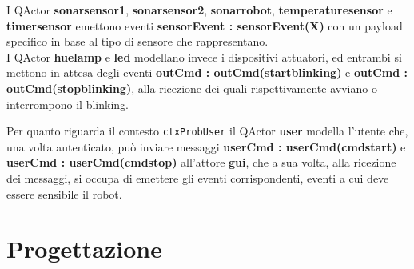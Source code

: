 \documentclass{llncs}
\newcommand{\action}[1]{\texttt{#1}\xspace}
\newcommand{\labelsec}[1]{\label{sec:#1}}
\begin{document}
I QActor \textbf{sonarsensor1}, \textbf{sonarsensor2}, \textbf{sonarrobot}, \textbf{temperaturesensor} e \textbf{timersensor} emettono eventi \textbf{sensorEvent : sensorEvent(X)} con un payload specifico in base al tipo di sensore che rappresentano. \\
I QActor \textbf{huelamp} e \textbf{led} modellano invece i dispositivi attuatori, ed entrambi si mettono in attesa degli eventi \textbf{outCmd : outCmd(startblinking)} e \textbf{outCmd : outCmd(stopblinking)}, alla ricezione dei quali rispettivamente avviano o interrompono il blinking. 

Per quanto riguarda il contesto \action{ctxProbUser} il QActor \textbf{user} modella l'utente che, una volta autenticato, può inviare messaggi \textbf{userCmd : userCmd(cmdstart)} e \textbf{userCmd : userCmd(cmdstop)} all'attore \textbf{gui}, che a sua volta, alla ricezione dei messaggi, si occupa di emettere gli eventi corrispondenti, eventi a cui deve essere sensibile il robot. 


\section{Progettazione}
\labelsec{Project}







\end{document}

